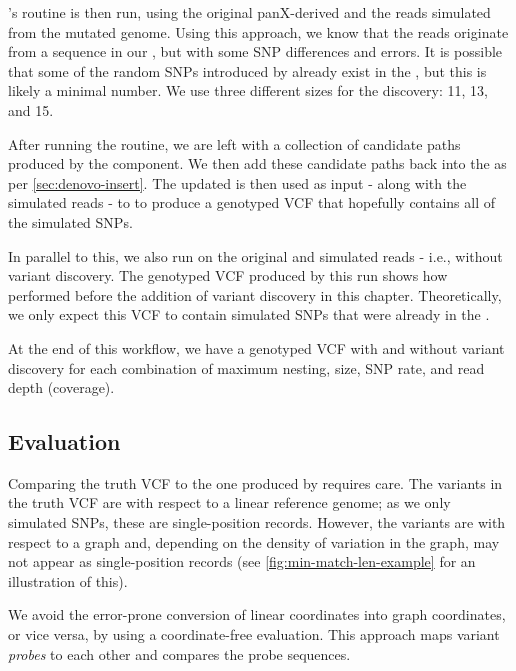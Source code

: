 \pandora{}'s  routine is then run, using the original panX-derived \panrg{} and the reads simulated from the mutated genome. Using this approach, we know that the reads originate from a sequence in our \panrg{}, but with some SNP differences and \ont{} errors. It is possible that some of the random SNPs introduced by  already exist in the \panrg{}, but this is likely a minimal number. We use three different \kmer{} sizes for the \denovo{} discovery: 11, 13, and 15. 

After running the  routine, we are left with a collection of candidate paths produced by the \denovo{} component. We then add these candidate paths back into the \panrg{} as per \autoref{sec:denovo-insert}. The updated \panrg{} is then used as input - along with the simulated reads - to \pandora{}  to produce a genotyped VCF that hopefully contains all of the simulated SNPs.

In parallel to this, we also run \pandora{}  on the original \panrg{} and simulated reads - i.e., without variant discovery. The genotyped VCF produced by this run shows how \pandora{} performed before the addition of \denovo{} variant discovery in this chapter. Theoretically, we only expect this VCF to contain simulated SNPs that were already in the \panrg{}.

At the end of this workflow, we have a genotyped VCF with and without \denovo{} variant discovery for each combination of maximum nesting, \denovo{} \kmer{} size, SNP rate, and read depth (coverage).

\subsection{Evaluation}
\label{sec:denovo-sims-eval}

Comparing the truth VCF to the one produced by \pandora{} requires care. The variants in the truth VCF are with respect to a linear reference genome; as we only simulated SNPs, these are single-position records. However, the \pandora{} variants are with respect to a graph and, depending on the density of variation in the graph, may not appear as single-position records (see \autoref{fig:min-match-len-example} for an illustration of this). 

We avoid the error-prone conversion of linear coordinates into graph coordinates, or vice versa, by using a coordinate-free evaluation. This approach maps variant \emph{probes} to each other and compares the probe sequences.  

